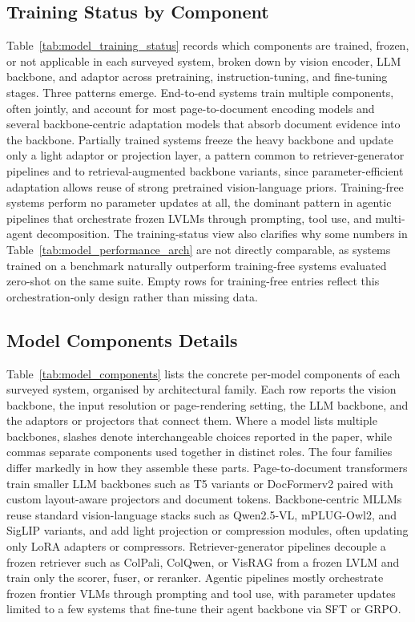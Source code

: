 \documentclass[11pt]{article}
\begin{document}
\subsection{Training Status by Component}
\label{app:training-status}
Table~\ref{tab:model_training_status} records which components are trained, frozen, or not applicable in each surveyed system, broken down by vision encoder, LLM backbone, and adaptor across pretraining, instruction-tuning, and fine-tuning stages. Three patterns emerge. End-to-end systems train multiple components, often jointly, and account for most page-to-document encoding models and several backbone-centric adaptation models that absorb document evidence into the backbone. Partially trained systems freeze the heavy backbone and update only a light adaptor or projection layer, a pattern common to retriever-generator pipelines and to retrieval-augmented backbone variants, since parameter-efficient adaptation allows reuse of strong pretrained vision-language priors. Training-free systems perform no parameter updates at all, the dominant pattern in agentic pipelines that orchestrate frozen LVLMs through prompting, tool use, and multi-agent decomposition. The training-status view also clarifies why some numbers in Table~\ref{tab:model_performance_arch} are not directly comparable, as systems trained on a benchmark naturally outperform training-free systems evaluated zero-shot on the same suite. Empty rows for training-free entries reflect this orchestration-only design rather than missing data.

\subsection{Model Components Details}
\label{app:components}
Table~\ref{tab:model_components} lists the concrete per-model components of each surveyed system, organised by architectural family. Each row reports the vision backbone, the input resolution or page-rendering setting, the LLM backbone, and the adaptors or projectors that connect them. Where a model lists multiple backbones, slashes denote interchangeable choices reported in the paper, while commas separate components used together in distinct roles. The four families differ markedly in how they assemble these parts. Page-to-document transformers train smaller LLM backbones such as T5 variants or DocFormerv2 paired with custom layout-aware projectors and document tokens. Backbone-centric MLLMs reuse standard vision-language stacks such as Qwen2.5-VL, mPLUG-Owl2, and SigLIP variants, and add light projection or compression modules, often updating only LoRA adapters or compressors. Retriever-generator pipelines decouple a frozen retriever such as ColPali, ColQwen, or VisRAG from a frozen LVLM and train only the scorer, fuser, or reranker. Agentic pipelines mostly orchestrate frozen frontier VLMs through prompting and tool use, with parameter updates limited to a few systems that fine-tune their agent backbone via SFT or GRPO.
\end{document}
